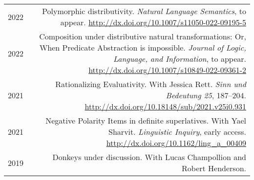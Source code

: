 \documentclass[12pt]{article}
\renewcommand{\arraystretch}{1.25} %
\newcommand{\doi}[1]{\url{http://dx.doi.org/#1}}
\newcommand{\refmark}{\textcolor{gray}{\textdagger}}
\begin{document}
\begingroup
\renewcommand{\arraystretch}{1.5} %
\begin{longtable}{LR}
  2022  & Polymorphic distributivity.\newline
          \textit{Natural Language Semantics}, to appear.\newline
          \doi{10.1007/s11050-022-09195-5}\\
  2022  & Composition under distributive natural transformations: Or, When
          Predicate Abstraction is impossible.\newline
          \textit{Journal of Logic, Language, and Information}, to
          appear.\newline
          \doi{10.1007/s10849-022-09361-2}\\
  2021  & Rationalizing Evaluativity.\newline
          With Jessica Rett.\newline
          \textit{Sinn und Bedeutung 25}, 187--204.\newline
          \doi{10.18148/sub/2021.v25i0.931}\\
  2021  & Negative Polarity Items in definite superlatives.\newline
          With Yael Sharvit.\newline
          \textit{Linguistic Inquiry}, early access.\newline
          \doi{10.1162/ling_a_00409}\\
  2019  & Donkeys under discussion.\newline
          With Lucas Champollion and Robert Henderson.\newline

\end{longtable}
\end{document}
